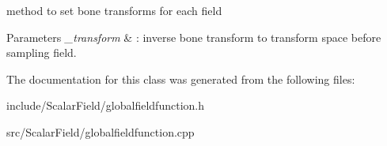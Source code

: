 method to set bone transforms for each field 


\begin{DoxyParams}{Parameters}
{\em \+\_\+transform} & \+: inverse bone transform to transform space before sampling field. \\
\hline
\end{DoxyParams}


The documentation for this class was generated from the following files\+:\begin{DoxyCompactItemize}
\item 
include/\+Scalar\+Field/globalfieldfunction.\+h\item 
src/\+Scalar\+Field/globalfieldfunction.\+cpp\end{DoxyCompactItemize}
